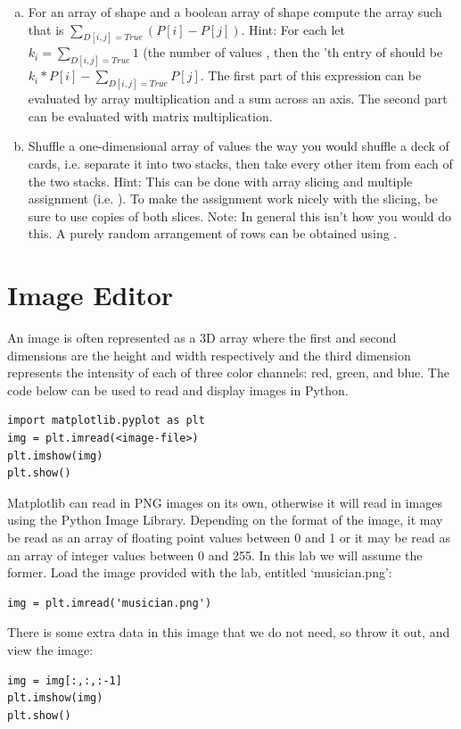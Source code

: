 \begin{problem}
\begin{enumerate}[a)]
\item For an array  of shape  and a boolean array of shape  compute the array  such that  is $\sum_{D[i,j] = True} \left( P[i] - P[j]\right)$.
Hint: For each  let $k_i = \sum_{D[i,j] = True} 1$ (the number of  values , then the 'th entry of  should be $k_i * P[i] - \sum_{D[i,j] = True} P[j]$.
The first part of this expression can be evaluated by array multiplication and a sum across an axis.
The second part can be evaluated with matrix multiplication.

\item Shuffle a one-dimensional array of values the way you would shuffle a deck of cards, i.e. separate it into two stacks, then take every other item from each of the two stacks.
Hint: This can be done with array slicing and multiple assignment (i.e. ).
To make the assignment work nicely with the slicing, be sure to use copies of both slices.
Note: In general this isn't how you would do this.
A purely random arrangement of rows can be obtained using .

\end{enumerate}
\end{problem}

\section*{Image Editor}
An image is often represented as a 3D array where the first and second dimensions are the height and width respectively and the third dimension represents the intensity of each of three color channels: red, green, and blue.
The code below can be used to read and display images in Python.
\begin{lstlisting}
import matplotlib.pyplot as plt
img = plt.imread(<image-file>)
plt.imshow(img)
plt.show()
\end{lstlisting}

Matplotlib can read in PNG images on its own, otherwise it will read in images using the Python Image Library.
Depending on the format of the image, it may be read as an array of floating point values between 0 and 1 or it may be read as an array of integer values between 0 and 255.
In this lab we will assume the former. Load the image provided with the lab, entitled `musician.png':
\begin{lstlisting}
img = plt.imread('musician.png')
\end{lstlisting}
There is some extra data in this image that we do not need, so throw it out, and view the image:
\begin{lstlisting}
img = img[:,:,:-1]
plt.imshow(img)
plt.show()
\end{lstlisting}

